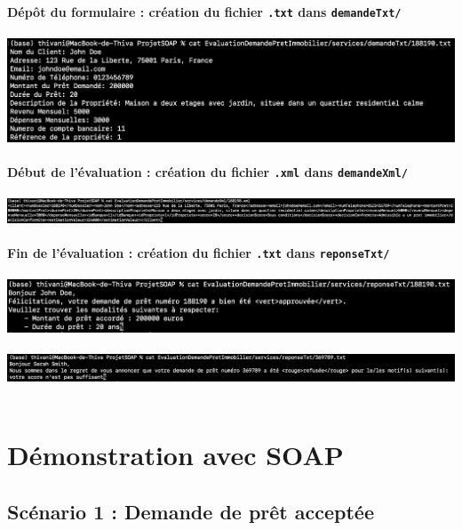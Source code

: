 \documentclass{article}
\begin{document}
    \textbf{Dépôt du formulaire : création du fichier \texttt{.txt} dans \texttt{demandeTxt/}}\\ \\
    \includegraphics[width=\textwidth]{Images/8.2/demandeTxtP.png}
    \\
    \\
    \textbf{Début de l'évaluation : création du fichier \texttt{.xml} dans \texttt{demandeXml/}}\\ \\
    \includegraphics[width=\textwidth]{Images/8.2/demandeXml.png}
    \\
    \\
    \textbf{Fin de l'évaluation : création du fichier \texttt{.txt} dans \texttt{reponseTxt/}}\\ \\
    \includegraphics[width=\textwidth]{Images/8.2/reponseTxtP.png}
    \\
    \\
    \includegraphics[width=\textwidth]{Images/8.2/reponseTxtN.png}
    \\
    \\
\newpage
\section{Démonstration avec SOAP}
    \subsection{Scénario 1 : Demande de prêt acceptée}
\end{document}
